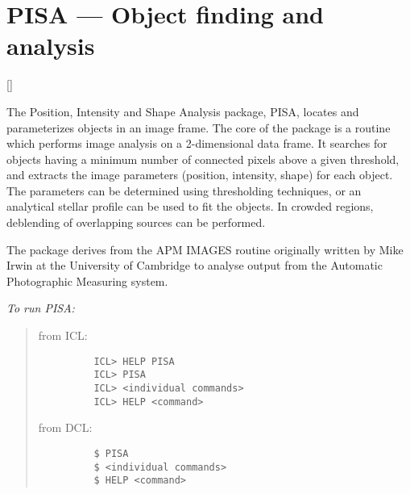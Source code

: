 \newpage

\section{PISA --- Object finding and analysis}

\vspace{-11mm}

\hfill []

\vspace{5mm}

The Position, Intensity and Shape Analysis package, PISA, locates and
parameterizes objects in an image frame.
The core of the package is a routine which performs image analysis on a
2-dimensional data frame.
It searches for objects having a minimum number of connected pixels above a
given threshold, and extracts the image parameters (position, intensity, shape)
for each object.
The parameters can be determined using thresholding techniques, or an analytical
stellar profile can be used to fit the objects.
In crowded regions, deblending of overlapping sources can be performed.

The package derives from the APM IMAGES routine originally written by Mike
Irwin at the University of Cambridge to analyse output from the Automatic
Photographic Measuring system.

{\em To run PISA:}\hfill
\begin{quote}
\begin{description}

\item [from ICL:]\hfill

\begin{small}
\begin{verbatim}
    ICL> HELP PISA
    ICL> PISA
    ICL> <individual commands>
    ICL> HELP <command>
\end{verbatim}
\end{small}

\item [from DCL:]\hfill

\begin{small}
\begin{verbatim}
    $ PISA
    $ <individual commands>
    $ HELP <command>
\end{verbatim}
\end{small}

\end{description}
\end{quote}

